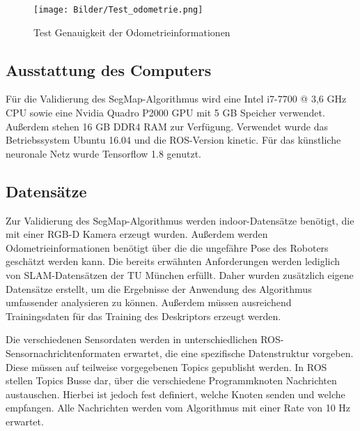 \begin{figure}
	\centering
	\texttt{[image: Bilder/Test\_odometrie.png]}
	\caption{Test Genauigkeit der Odometrieinformationen}
	\label{fig:Test_Odometrie}
\end{figure}

\subsection{Ausstattung des Computers}

Für die Validierung des SegMap-Algorithmus wird eine Intel i7-7700 @ 3,6 GHz CPU sowie eine Nvidia Quadro P2000 GPU mit 5 GB Speicher verwendet. Außerdem stehen 16 GB DDR4 RAM zur Verfügung. Verwendet wurde das Betriebssystem Ubuntu 16.04 und die ROS-Version kinetic. Für das künstliche neuronale Netz wurde Tensorflow 1.8 genutzt. 

\subsection[Datensätze (Schmelzer)]{Datensätze}
\label{sec:Datensatz}

Zur Validierung des SegMap-Algorithmus werden indoor-Datensätze benötigt, die mit einer RGB-D Kamera erzeugt wurden. Außerdem werden Odometrieinformationen benötigt über die die ungefähre Pose des Roboters geschätzt werden kann. Die bereits erwähnten Anforderungen werden lediglich von SLAM-Datensätzen der TU München erfüllt. Daher wurden zusätzlich eigene Datensätze erstellt, um die Ergebnisse der Anwendung des Algorithmus umfassender analysieren zu können. Außerdem müssen ausreichend Trainingsdaten für das Training des Deskriptors erzeugt werden. 

Die verschiedenen Sensordaten werden in unterschiedlichen ROS-Sensornachrichtenformaten erwartet, die eine spezifische Datenstruktur vorgeben. Diese müssen auf teilweise vorgegebenen Topics gepublisht werden. In ROS stellen Topics Busse dar, über die verschiedene Programmknoten Nachrichten austauschen. Hierbei ist jedoch fest definiert, welche Knoten senden und welche empfangen. Alle Nachrichten werden vom Algorithmus mit einer Rate von 10 Hz erwartet. 

